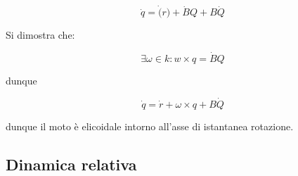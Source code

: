 \documentclass{article}
\begin{document}
\begin{equation}
    \dot{q}= \dot(r)+\dot{B}Q+ B\dot{Q}
\end{equation}

Si dimostra che:

\begin{equation}
    \exists \omega \in k : w \times q= \dot{B}Q
\end{equation}

dunque

\begin{equation}
    \dot{q}= \dot{r}+\omega \times q+ B\dot{Q}
\end{equation}

dunque il moto è elicoidale intorno all'asse di istantanea rotazione.

\subsection{Dinamica relativa}
\end{document}
